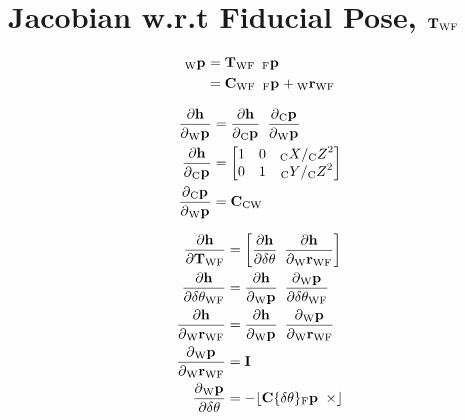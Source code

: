 \section{Jacobian w.r.t Fiducial Pose, $\Tf{\world}{\fiducial}$}

\begin{align}
\begin{split}
  \Pt{\world}
		&= \Tf{\world}{\fiducial}
			\enspace
			\Pt{\fiducial} \\
		&= \Rot{\world}{\fiducial}
			\enspace
			\Pt{\fiducial}
			+ \Trans{\world}{\fiducial}
\end{split}
\end{align}

\begin{align}
  \dfrac{\partial{\projFunc}}{\partial{\Pt{\world}}}
		&=
			\dfrac{\partial{\projFunc}}{\partial{\Pt{\cam}}}
			\enspace
			\dfrac{\partial{\Pt{\cam}}}{\partial{\Pt{\world}}} \\
  \dfrac{\partial{\projFunc}}{\partial{\Pt{\cam}}}
		&=
			\begin{bmatrix}
				1 & 0 & \KineNotationBare{X}{\cam} / \KineNotationBare{Z}{\cam}^{2} \\
				0 & 1 & \KineNotationBare{Y}{\cam} / \KineNotationBare{Z}{\cam}^{2}
			\end{bmatrix} \\
  \dfrac{\partial{\Pt{\cam}}}{\partial{\Pt{\world}}}
		&= \Rot{\cam}{\world}
\end{align}

\begin{align}
	\dfrac{\partial{\projFunc}}{\partial{\Tf{\world}{\fiducial}}}
		&=
			\begin{bmatrix}
				\dfrac{\partial \projFunc}{\partial \delta\Vec{\theta}}
				\enspace
				\dfrac{\partial \projFunc}{\partial \Pos{\world}{\fiducial}}
			\end{bmatrix} \\
  \dfrac{\partial{\projFunc}}
				{\partial{\delta\Vec{\theta}_{\world\fiducial}}}
		&=
			\dfrac{\partial{\projFunc}}
						{\partial{\Pt{\world}}}
			\enspace
			\dfrac{\partial{\Pt{\world}}}
						{\partial{\delta\Vec{\theta}_{\world\fiducial}}} \\
  \dfrac{\partial{\projFunc}}{\partial{\Pos{\world}{\fiducial}}}
		&=
			\dfrac{\partial{\projFunc}}{\partial{\Pt{\world}}}
			\enspace
			\dfrac{\partial{\Pt{\world}}}{\partial{\Pos{\world}{\fiducial}}} \\
  \dfrac{\partial{\Pt{\world}}}{\partial{\Pos{\world}{\fiducial}}}
		&= \I \\
  \dfrac{\partial{\Pt{\world}}}{\partial{\delta\Vec{\theta}}}
		&= -\Skew{\rot\{\delta \theta\} \Pt{\fiducial}}
\end{align}
